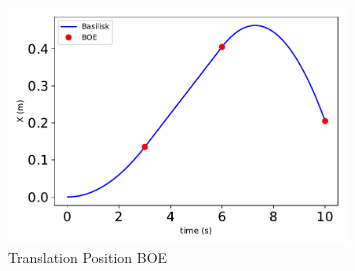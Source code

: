 \begin{figure}[htbp]\centerline{\includegraphics[width=0.8\textwidth]{AutoTeX/scPlusTranslationPositionBOE}}\caption{Translation Position BOE}\label{fig:scPlusTranslationPositionBOE}\end{figure}